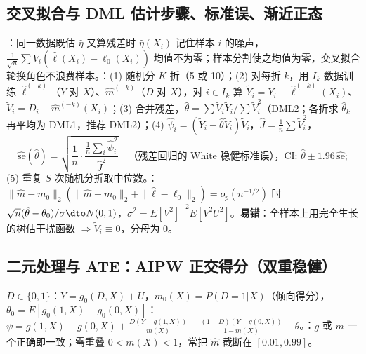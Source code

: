 \subsection{交叉拟合与 DML 估计步骤、标准误、渐近正态}
：同一数据既估 $\hat\eta$ 又算残差时 $\hat\eta(X_i)$ 记住样本 $i$ 的噪声，$\frac1{\sqrt n}\sum V_i(\hat\ell(X_i)-\ell_0(X_i))$ 均值不为零；样本分割使之均值为零，交叉拟合轮换角色不浪费样本。：(1) 随机分 $K$ 折（5 或 10）；(2) 对每折 $k$，用 $I_k$ 数据训练 $\hat\ell^{(-k)}$（$Y$ 对 $X$）、$\hat m^{(-k)}$（$D$ 对 $X$），对 $i\in I_k$ 算 $\tilde Y_i=Y_i-\hat\ell^{(-k)}(X_i)$、$\tilde V_i=D_i-\hat m^{(-k)}(X_i)$；(3) 合并残差，$\hat\theta=\sum\tilde V_i\tilde Y_i/\sum\tilde V_i^2$（DML2；各折求 $\hat\theta_k$ 再平均为 DML1，推荐 DML2）；(4) $\hat\psi_i=(\tilde Y_i-\hat\theta\tilde V_i)\tilde V_i$，$\hat J=\frac1n\sum\tilde V_i^2$，
\[\widehat{\mathrm{se}}(\hat\theta)=\sqrt{\frac1n\cdot\frac{\frac1n\sum_i\hat\psi_i^2}{\hat J^2}}\quad\text{（残差回归的 White 稳健标准误），CI: }\hat\theta\pm1.96\,\widehat{\mathrm{se}};\]
(5) 重复 $S$ 次随机分折取中位数。：$\|\hat m-m_0\|_2(\|\hat m-m_0\|_2+\|\hat\ell-\ell_0\|_2)=o_p(n^{-1/2})$ 时 $\sqrt n(\hat\theta-\theta_0)/\sigma\dto N(0,1)$，$\sigma^2=E[V^2]^{-2}E[V^2U^2]$。\textbf{易错}：全样本上用完全生长的树估干扰函数 $\Rightarrow\tilde V_i\equiv0$，分母为 0。

\subsection{二元处理与 ATE：AIPW 正交得分（双重稳健）}
$D\in\{0,1\}$：$Y=g_0(D,X)+U$，$m_0(X)=P(D=1|X)$（倾向得分），$\theta_0=E[g_0(1,X)-g_0(0,X)]$：
$\psi=g(1,X)-g(0,X)+\frac{D(Y-g(1,X))}{m(X)}-\frac{(1-D)(Y-g(0,X))}{1-m(X)}-\theta$。：$g$ 或 $m$ 一个正确即一致；需重叠 $0<m(X)<1$，常把 $\hat m$ 截断在 $[0.01,0.99]$。

